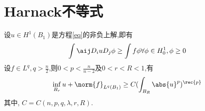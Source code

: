 \section{Harnack不等式}
\begin{theorem}[弱Harnack不等式] \label{weak_harnack}
    设$u \in H^1(B_1)$是方程\eqref{eq}的非负上解,即有
    \begin{equation}
        \int \aij D_iuD_j\phi \ge \int f \phi \forall \phi \in H^1_0, \phi \ge 0
    \end{equation}
    设$f \in L^q, q > \frac{n}{2}$,则$0<p < \frac{n}{n-2}$及$0 < r < R <1$,有
    \begin{equation}
        \inf_{B_r}u + \norm{f}_{L^q(B_1)} \ge C(\int_{B_R}\abs{u}^p)^\rec{p}
    \end{equation}
    其中, $C=C(n,p,q,\lambda,r,R)$.
\end{theorem}
